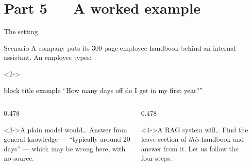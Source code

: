\documentclass[aspectratio=169,11pt]{beamer}
\begin{document}
\section{Part 5 --- A worked example}

\begin{frame}{The setting}
  \begin{block}{Scenario}
    A company puts its 300-page employee handbook behind an internal
    assistant. An employee types:
  \end{block}
  \begin{center}
    \begin{uncoverenv}<2->
    \begin{beamercolorbox}[sep=8pt,rounded=true,center,wd=0.75\textwidth]{block title example}
      \large ``How many days off do I get in my first year?''
    \end{beamercolorbox}
    \end{uncoverenv}
  \end{center}
  \medskip
  \begin{columns}[T,onlytextwidth]
    \begin{column}{0.478\textwidth}
      \begin{alertblock}<3->{A plain model would\dots}
        Answer from general knowledge --- ``typically around 20 days'' ---
        which may be wrong here, with no source.
      \end{alertblock}
    \end{column}
    \begin{column}{0.478\textwidth}
      \begin{exampleblock}<4->{A RAG system will\dots}
        Find the leave section of \emph{this} handbook and answer from it.
        Let us follow the four steps.
      \end{exampleblock}
    \end{column}
  \end{columns}
\end{frame}
\end{document}
